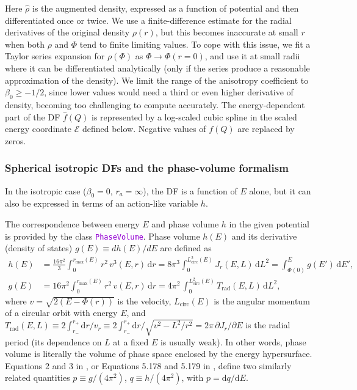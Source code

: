 \documentclass[12pt]{article}
\newcommand{\ttt}[1]{\textcolor{darkviolet}{\texttt{#1}}}
\renewcommand{\d}{\mathrm{d}}
\newcommand{\D}{\partial}
\newcommand{\scE}{\mathscr E}
\begin{document}
Here $\hat\rho$ is the augmented density, expressed as a function of potential and then differentiated once or twice.
We use a finite-difference estimate for the radial derivatives of the original density $\rho(r)$, but this becomes inaccurate at small $r$ when both $\rho$ and $\Phi$ tend to finite limiting values. To cope with this issue, we fit a Taylor series expansion for $\rho(\Phi)$ as $\Phi \to \Phi(r=0)$, and use it at small radii where it can be differentiated analytically (only if the series produce a reasonable approximation of the density). We limit the range of the anisotropy coefficient to $\beta_0 \ge -1/2$, since lower values would need a third or even higher derivative of density, becoming too challenging to compute accurately.
The energy-dependent part of the DF $\hat f(Q)$ is represented by a log-scaled cubic spline in the scaled energy coordinate $\scE$ defined below. Negative values of $f(Q)$ are replaced by zeros.


\subsubsection{Spherical isotropic DFs and the phase-volume formalism}  \label{sec:DFsphericalIsotropicDetails}

In the isotropic case ($\beta_0=0$, $r_a=\infty$), the DF is a function of $E$ alone, but it can also be expressed in terms of an action-like variable $h$.

The correspondence between energy $E$ and phase volume $h$ in the given potential is provided by the class \ttt{PhaseVolume}. Phase volume $h(E)$ and its derivative (density of states) $g(E)\equiv dh(E)/dE$ are defined as
\begin{subequations}
\begin{align}
h(E) &= \frac{16\pi^2}3 \int_0^{r_\mathrm{max}(E)} r^2\, v^3(E,r)\, \d r =
  8\pi^3\int_0^{L^2_\mathrm{circ}(E)} J_r(E,L)\,\d L^2 =
  \int_{\Phi(0)}^E g(E')\, \d E' ,\\
g(E) &= 16\pi^2 \int_0^{r_\mathrm{max}(E)} r^2\, v(E,r)\, \d r =
  4\pi^2\, \int_0^{L_\mathrm{circ}^2(E)} T_\mathrm{rad}(E,L)\,\d L^2,
\end{align}
\end{subequations}
where  $v = \sqrt{2(E-\Phi(r))}$ is the velocity,  $L_\mathrm{circ}(E)$ is the angular momentum of a circular orbit with energy $E$,  and  $T_\mathrm{rad}(E,L) \equiv 2 \int_{r_-}^{r_+} \d r/v_r \equiv 2 \int_{r_-}^{r_+} \d r/\sqrt{v^2-L^2/r^2} = 2\pi\,\D J_r/\D E$ is the radial period (its dependence on $L$ at a fixed $E$ is usually weak).
In other words, phase volume is literally the volume of phase space enclosed by the energy hypersurface. Equations 2 and 3 in \cite{Cohn1980}, or Equations 5.178 and 5.179 in \cite{Merritt2013}, define two similarly related quantities $p\equiv g/(4\pi^2)$, $q\equiv h/(4\pi^2)$, with $p=\d q/\d E$.
\end{document}
